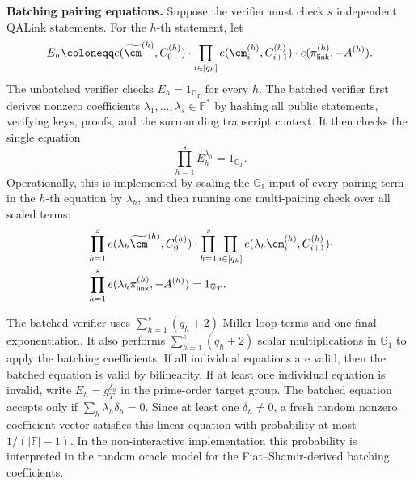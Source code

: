 \noindent\textbf{Batching pairing equations.}
Suppose the verifier must check \(s\) independent QALink statements.  For the
\(h\)-th statement, let
\[
  E_h
  \coloneqq
  e(\widetilde{\cm}^{(h)},C^{(h)}_0)
  \cdot
  \prod_{i\in[q_h]} e(\cm^{(h)}_i,C^{(h)}_{i+1})
  \cdot
  e(\pi^{(h)}_{\mathsf{link}},-A^{(h)}).
\]
The unbatched verifier checks \(E_h=1_{\mathbb{G}_T}\) for every \(h\).  The
batched verifier first derives nonzero coefficients
\(\lambda_1,\ldots,\lambda_s\in\mathbb{F}^{\ast}\) by hashing all public
statements, verifying keys, proofs, and the surrounding transcript context.  It
then checks the single equation
\[
  \prod_{h=1}^{s} E_h^{\lambda_h}=1_{\mathbb{G}_T}.
\]
Operationally, this is implemented by scaling the \(\mathbb{G}_1\) input of
every pairing term in the \(h\)-th equation by \(\lambda_h\), and then running
one multi-pairing check over all scaled terms:
\[
\begin{aligned}
  &\prod_{h=1}^{s}
  e(\lambda_h\widetilde{\cm}^{(h)},C^{(h)}_0)
  \cdot
  \prod_{h=1}^{s}\prod_{i\in[q_h]}
  e(\lambda_h\cm^{(h)}_i,C^{(h)}_{i+1})
  \cdot \\
  &\prod_{h=1}^{s}
  e(\lambda_h\pi^{(h)}_{\mathsf{link}},-A^{(h)})
  =
  1_{\mathbb{G}_T}.
\end{aligned}
\]

The batched verifier uses \(\sum_{h=1}^{s}(q_h+2)\) Miller-loop terms and one
final exponentiation.  It also performs \(\sum_{h=1}^{s}(q_h+2)\) scalar
multiplications in \(\mathbb{G}_1\) to apply the batching coefficients.  If all
individual equations are valid, then the batched equation is valid by
bilinearity.  If at least one individual equation is invalid, write
\(E_h=g_T^{\delta_h}\) in the prime-order target group.  The batched equation
accepts only if \(\sum_h \lambda_h\delta_h=0\).  Since at least one
\(\delta_h\neq 0\), a fresh random nonzero coefficient vector satisfies this
linear equation with probability at most \(1/(|\mathbb{F}|-1)\).  In the
non-interactive implementation this probability is interpreted in the random
oracle model for the Fiat--Shamir-derived batching coefficients.
